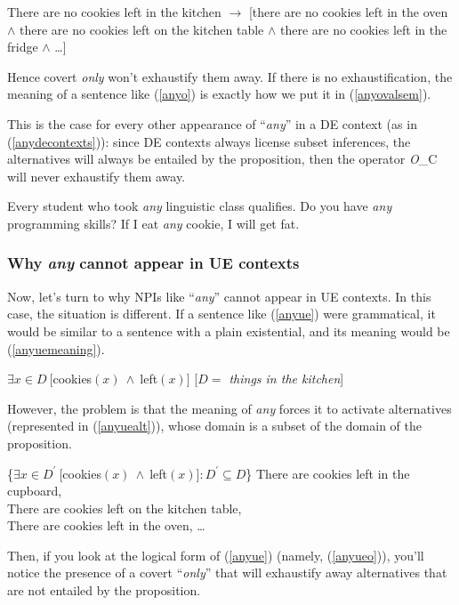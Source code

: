 \documentclass[a4paper,11pt]{article}
\newcommand{\reff}[1]{(\ref{#1})}
\newcommand{\exs}[2][]{\begin{exe}\ex #1 \begin{xlist}#2\end{xlist}\end{exe}}
\begin{document}
\begin{exe}
\ex There are no cookies left in the kitchen $\rightarrow$ [there are no cookies left in the oven $\wedge$ there are no cookies left on the kitchen table $\wedge$ there are no cookies left in the fridge $\wedge$ \ldots{}]
\end{exe}
%
Hence covert \emph{only} won't exhaustify them away. If there is no exhaustification, the meaning of a sentence like \reff{anyo} is exactly how we put it in \reff{anyovalsem}.

This is the case for every other appearance of \enquote{\emph{any}} in a DE context (as in \reff{anydecontexts}): since DE contexts always license subset inferences, the alternatives will always be entailed by the proposition, then the operator \emph{O}_C will never exhaustify them away.

\exs[\label{anydecontexts}]{
  \ex Every student who took \emph{any} linguistic class qualifies.
  \ex Do you have \emph{any} programming skills?
  \ex If I eat \emph{any} cookie, I will get fat.
}


\subsubsection{Why \emph{any} cannot appear in UE contexts}\label{subsec:anyue}
Now, let's turn to why NPIs like \enquote{\emph{any}} cannot appear in UE contexts. In this case, the situation is different. If a sentence like \reff{anyue} were grammatical, it would be similar to a sentence with a plain existential, and its meaning would be \reff{anyuemeaning}.

\exs{
	\label{anyue}
	\ex\label{anyuemeaning} $\exists{x \in D}~[$cookies$(x)~\wedge~$left$(x)]$ \hfill [\emph{$D =$ things in the kitchen}]
}
%
However, the problem is that the meaning of \emph{any} forces it to activate alternatives (represented in \reff{anyuealt}), whose domain is a subset of the domain of the proposition.

\exs[\label{anyuealt}]{	
	\ex \{$\exists{x \in D^{\prime}}~[$cookies$(x)~\wedge~$left$(x)]: D^{\prime} \subseteq D$\}
	\ex\label{anyuealtexamples} There are cookies left in the cupboard,\\
		There are cookies left on the kitchen table,\\
		There are cookies left in the oven, \ldots{}
}
%
Then, if you look at the logical form of \reff{anyue} (namely, \reff{anyueo}), you'll notice the presence of a covert \enquote{\emph{only}} that will exhaustify away alternatives that are not entailed by the proposition. 
\end{document}
